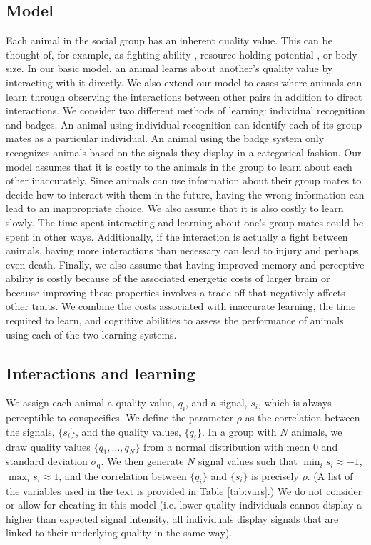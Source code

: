 \subsection*{Model}
%
Each animal in the social group has an inherent quality value. This can be thought of, for example, as fighting ability \cite{}, resource holding potential \cite{}, or body size. In our basic model, an animal learns about another's quality value by interacting with it directly. We also extend our model to cases where animals can learn through observing the interactions between other pairs in addition to direct interactions. We consider two different methods of learning: individual recognition and badges. An animal using individual recognition can identify each of its group mates as a particular individual. An animal using the badge system only recognizes animals based on the signals they display in a categorical fashion. Our model assumes that it is costly to the animals in the group to learn about each other inaccurately. Since animals can use information about their group mates to decide how to interact with them in the future, having the wrong information can lead to an inappropriate choice. We also assume that it is also costly to learn slowly. The time spent interacting and learning about one's group mates could be spent in other ways. Additionally, if the interaction is actually a fight between animals, having more interactions than necessary can lead to injury and perhaps even death. Finally, we also assume that having improved memory and perceptive ability is costly because of the associated energetic costs of larger brain or because improving these properties involves a trade-off that negatively affects other traits. We combine the costs associated with inaccurate learning, the time required to learn, and cognitive abilities to assess the performance of animals using each of the two learning systems. 

\subsection{Interactions and learning }
We assign each animal a quality value, $q_i$, and a signal, $s_i$, which is always perceptible to conspecifics. We define the parameter $\rho$ as the correlation between the signals, $\{s_i\}$, and the quality values, $\{q_i\}$. In a group with $N$ animals, we draw quality values $\{q_1,\dots,q_N\}$ from a normal distribution with mean $0$ and standard deviation $\sigma_\text{q}$. We then generate $N$ signal values such that $\min_i{s_i}\approx -1$, $\max_i{s_i}\approx 1$, and the correlation between $\{q_i\}$ and $\{s_i\}$ is precisely $\rho$. (A list of the variables used in the text is provided in Table \ref{tab:vars}.) 
We do not consider or allow for cheating in this model (i.e. lower-quality individuals cannot display a higher than expected signal intensity, all individuals display signals that are linked to their underlying quality in the same way).
  
